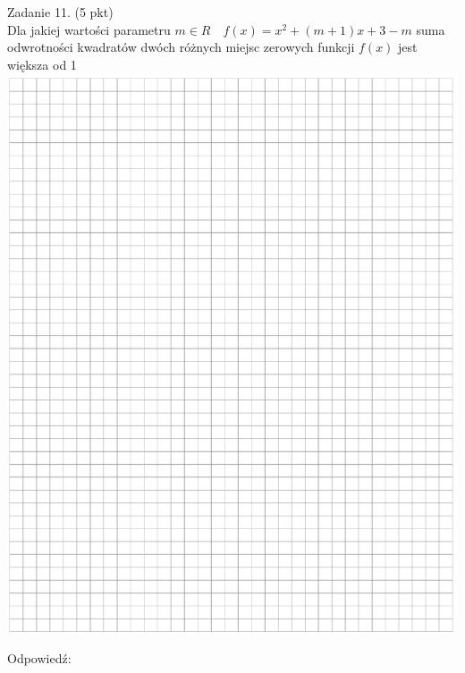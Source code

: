 \documentclass[10pt]{article}
\begin{document}
Zadanie 11. (5 pkt)\\
Dla jakiej wartości parametru \(m \in R \quad f(x)=x^{2}+(m+1) x+3-m\) suma odwrotności kwadratów dwóch różnych miejsc zerowych funkcji \(f(x)\) jest większa od 1\\
\includegraphics[max width=\textwidth, center]{2024_11_21_caad0d2d07cc5c30818fg-09}

Odpowiedź:
\end{document}
